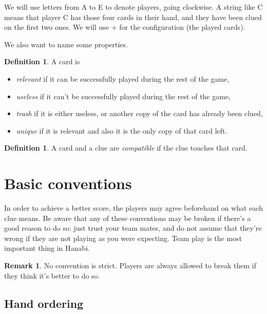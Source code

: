 \documentclass[a4paper]{article}
\theoremstyle{plain}
\theoremstyle{definition}
\newtheorem{definition}[theorem]{Definition}
\newtheorem{remark}[theorem]{Remark}
\begin{document}
We will use letters from A to E to denote players, going clockwise. A string like C     means that player C has those four cards in their hand, and they have been clued on the first two ones. We will use $+$ for the configuration (the played cards).

We also want to name some properties.

\begin{definition}
	A card is
	
	\begin{itemize}
		\item \textit{relevant} if it can be successfully played during the rest of the game,
		\item \textit{useless} if it can't be successfully played during the rest of the game,
		\item \textit{trash} if it is either useless, or another copy of the card has already been clued,
		\item \textit{unique} if it is relevant and also it is the only copy of that card left.
	\end{itemize}

\end{definition}

\begin{definition}
	A card and a clue are \emph{compatible} if the clue touches that card.
\end{definition}

\section{Basic conventions}

In order to achieve a better score, the players may agree beforehand on what each clue means. Be aware that any of these conventions may be broken if there's a good reason to do so: just trust your team mates, and do not assume that they're wrong if they are not playing as you were expecting. Team play is the most important thing in Hanabi.

\begin{remark}
	No convention is strict. Players are always allowed to break them if they think it's better to do so.
\end{remark}

\subsection{Hand ordering}
\end{document}
